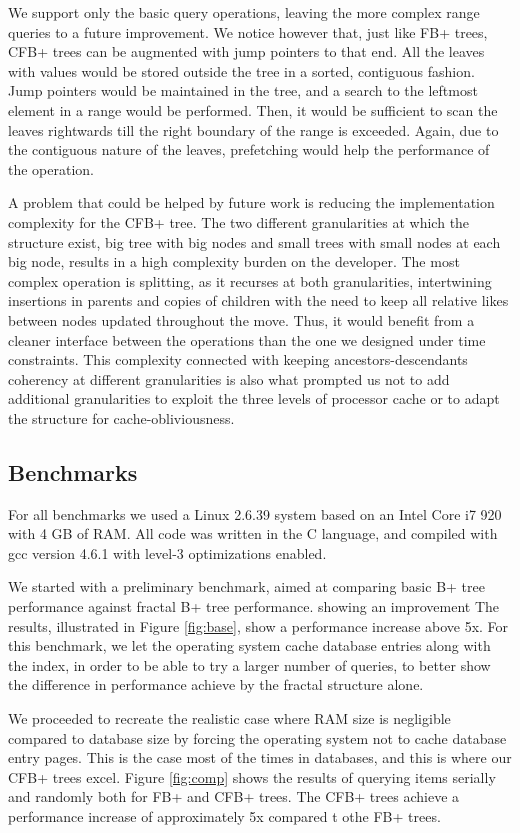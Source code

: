 \documentclass{article}
\begin{document}
We support only the basic query operations, leaving the more complex range queries to a future improvement.
We notice however that, just like FB+ trees, CFB+ trees can be augmented with jump pointers to that end.
All the leaves with values would be stored outside the tree in a sorted, contiguous fashion.
Jump pointers would be maintained in the tree, and a search to the leftmost element in a range would be performed.
Then, it would be sufficient to scan the leaves rightwards till the right boundary of the range is exceeded.
Again, due to the contiguous nature of the leaves, prefetching would help the performance of the operation.

A problem that could be helped by future work is reducing the implementation complexity for the CFB+ tree.
The two different granularities at which the structure exist, big tree with big nodes and small trees with small nodes
at each big node, results in a high complexity burden on the developer.
The most complex operation is splitting, as it recurses at both granularities, intertwining insertions in parents
and copies of children with the need to keep all relative likes between nodes updated throughout the move.
Thus, it would benefit from a cleaner interface between the operations than the one we designed under
time constraints. 
This complexity connected with keeping ancestors-descendants coherency at different granularities
is also what prompted us not to add additional granularities to exploit the three levels of processor cache
or to adapt the structure for cache-obliviousness.


\subsection{Benchmarks}
For all benchmarks we used a Linux 2.6.39 system based on an Intel Core i7 920 with 4 GB of RAM.
All code was written in the C language, and compiled with gcc version 4.6.1 with level-3 optimizations enabled.

We started with a preliminary benchmark, aimed at comparing basic B+ tree performance against fractal B+ tree performance. showing an improvement
The results, illustrated in Figure \ref{fig:base}, show a performance increase above 5x.
For this benchmark, we let the operating system cache database entries along with the index,
in order to be able to try a larger number of queries, to better show the difference in performance
achieve by the fractal structure alone.

We proceeded to recreate the realistic case where RAM size is negligible compared to database size by
forcing the operating system not to cache database entry pages.
This is the case most of the times in databases, and this is where our CFB+ trees excel.
Figure \ref{fig:comp} shows the results of querying items serially and randomly both for FB+ and CFB+ trees.
The CFB+ trees achieve a performance increase of approximately 5x compared t othe FB+ trees.
\end{document}
